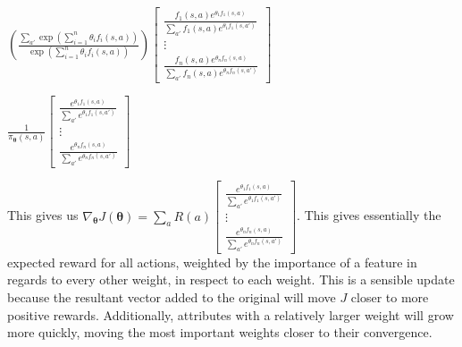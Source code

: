 \documentclass[fleqn]{hermans-hw}
\begin{document}
$ \left( \frac {\sum_{a'} \exp \left( \sum_{i=1}^n \theta_i f_i(s,a)  \right)}
{ \exp \left( \sum_{i=1}^n \theta_i f_i(s,a)  \right)} \right) 
\begin{bmatrix} \frac{f_1(s,a) e^{\theta_1 f_1(s,a)}}{\sum_{a'} f_1(s,a) e^{\theta_1 f_1(s,a')}}\\ \vdots \\ \frac{f_n(s,a) e^{\theta_n f_n(s,a)}}{\sum_{a'} f_n(s,a) e^{\theta_n f_n(s,a')}}
\end{bmatrix}
$

$\frac{1}{\pi_{\mathbf \theta}(s,a)} \begin{bmatrix} \frac{e^{\theta_1 f_1(s,a)}}{\sum_{a'} e^{\theta_1 f_1(s,a')}}\\ \vdots \\ \frac{e^{\theta_n f_n(s,a)}}{\sum_{a'} e^{\theta_n f_n(s,a')}}
\end{bmatrix}$

This gives us $\nabla_{\mathbf \theta} J(\mathbf \theta) 
= \sum_a R(a) \begin{bmatrix} \frac{e^{\theta_1 f_1(s,a)}}{\sum_{a'} e^{\theta_1 f_1(s,a')}}\\ \vdots \\ \frac{e^{\theta_n f_n(s,a)}}{\sum_{a'} e^{\theta_n f_n(s,a')}}
\end{bmatrix}$. This gives essentially the expected reward for all actions, weighted by the importance of a feature in regards to every other weight, in respect to each weight. This is a sensible update because the resultant vector added to the original will move $J$ closer to more positive rewards. Additionally, attributes with a relatively larger weight will grow more quickly, moving the most important weights closer to their convergence. 
\end{document}
